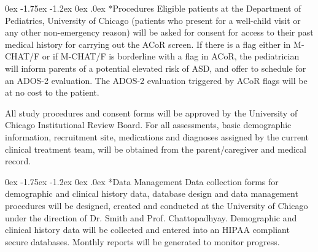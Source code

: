 \documentclass[onecolumn, compsoc,11pt]{IEEEtran}
\makeatletter
\renewcommand\subsection{\@startsection {subsection}{2}{\z@}%
                                   {0ex \@plus -1.75ex \@minus -1.2ex}%
                                   {0ex \@plus.0ex}%
                                   {\fontsize{11}{11}\selectfont\bfseries\sffamily\color{black}}}
\def\ZERO{ACoR\xspace}
\makeatother
\begin{document}
\subsection*{Procedures} Eligible patients at the Department of Pediatrics, University of Chicago (patients who present for a well-child visit or any other non-emergency reason) will be asked  for consent for access to their past medical history for carrying out the \ZERO screen. 
If there is a flag either in M-CHAT/F or if M-CHAT/F is borderline with a flag in \ZERO, the  pediatrician will inform parents of a potential elevated risk of ASD, and offer to schedule for an ADOS-2 evaluation. 
The ADOS-2 evaluation triggered by \ZERO flags will be at no cost to the patient.

 All study procedures and consent forms will be approved by the University of Chicago Institutional Review Board.  For all assessments, basic demographic information, recruitment site, medications and diagnoses assigned by the current clinical treatment team, will be obtained from the parent/caregiver and medical record.

\subsection*{Data Management} Data collection forms for demographic and clinical history data, database design and data management procedures will be designed, created and conducted at the University of Chicago under the
direction of Dr. Smith and Prof. Chattopadhyay. Demographic and clinical history data will be collected and entered into an HIPAA compliant secure databases.  Monthly reports will be generated  to monitor progress. 


\clearpage
\normalem 



\end{document}
